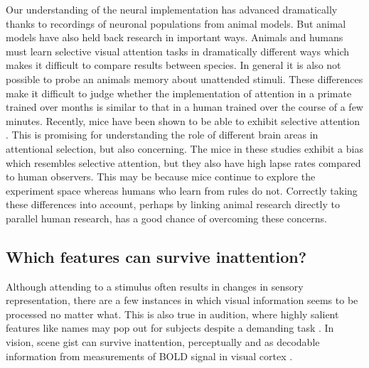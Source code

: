 Our understanding of the neural implementation has advanced dramatically thanks to recordings of neuronal populations from animal models. But animal models have also held back research in important ways. Animals and humans must learn selective visual attention tasks in dramatically different ways \citep{Birman2015-fj} which makes it difficult to compare results between species. In general it is also not possible to probe an animals memory about unattended stimuli. These differences make it difficult to judge whether the implementation of attention in a primate trained over months is similar to that in a human trained over the course of a few minutes. Recently, mice have been shown to be able to exhibit selective attention \citep{McBride2019-py,Wang2018-ge, Nakajima2019-ec}. This is promising for understanding the role of different brain areas in attentional selection, but also concerning. The mice in these studies exhibit a bias which resembles selective attention, but they also have high lapse rates compared to human observers. This may be because mice continue to explore the experiment space \citep{Pisupati2019-cl} whereas humans who learn from rules do not. Correctly taking these differences into account, perhaps by linking animal research directly to parallel human research, has a good chance of overcoming these concerns. 

\subsection{Which features can survive inattention?}

Although attending to a stimulus often results in changes in sensory representation, there are a few instances in which visual information seems to be processed no matter what. This is also true in audition, where highly salient features like names may pop out for subjects despite a demanding task \citep{Moray1959-fn}. In vision, scene gist can survive inattention, perceptually \citep{Li2002-ji} and as decodable information from measurements of BOLD signal in visual cortex \citep{Peelen2009-us}.


